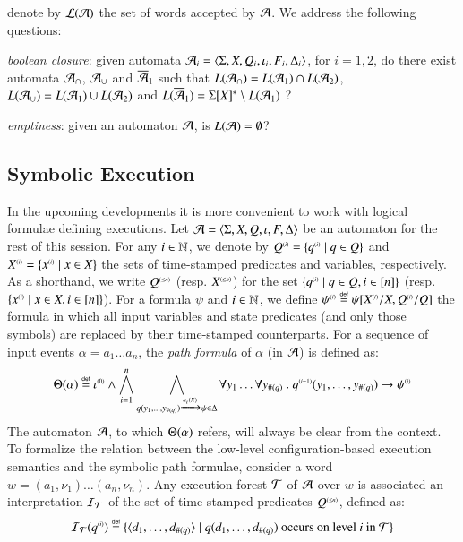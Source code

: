 \documentclass{llncs}
\begin{document}
denote by ${\mathcal L}({\mathcal{A}})$ the set of words accepted by $\mathcal{A}$. We address
the following questions: \begin{compactenum}
\item \emph{boolean closure}: given automata $\mathcal{A}_i =
  \langle \Sigma,X,Q_i,\iota_i,F_i,\Delta_i \rangle$, for $i=1,2$, do there
  exist automata $\mathcal{A}_\cap$, $\mathcal{A}_\cup$ and $\overline{\mathcal{A}}_1$ such that
  $L(\mathcal{A}_\cap) = L(\mathcal{A}_1) \cap L(\mathcal{A}_2)$, $L(\mathcal{A}_\cup) = L(\mathcal{A}_1) \cup
  L(\mathcal{A}_2)$ and $L(\overline{\mathcal{A}}_1) = \Sigma[X]^* \setminus L(\mathcal{A}_1)$ ?
%
\item \emph{emptiness}: given an automaton $\mathcal{A}$, is $L(\mathcal{A}) =
  \emptyset$?
\end{compactenum}

\subsection{Symbolic Execution}

In the upcoming developments it is more convenient to work with
logical formulae defining executions. Let $\mathcal{A} =
\langle \Sigma,X,Q,\iota,F,\Delta \rangle$ be an automaton for the rest of
this session. For any $i \in {\bf \mathbb{N}}$, we denote by ${Q}^{\scriptscriptstyle{({i})}} =
\{ {q}^{\scriptscriptstyle{({i})}} \mid q \in Q \}$ and ${X}^{\scriptscriptstyle{({i})}} = \{ {x}^{\scriptscriptstyle{({i})}}
  \mid x \in X \}$ the sets of time-stamped predicates and variables,
respectively. As a shorthand, we write ${Q}^{\scriptscriptstyle{({\leq n})}}$ (resp.
${X}^{\scriptscriptstyle{({\leq n})}}$) for the set $\{ {q}^{\scriptscriptstyle{({i})}} \mid q \in Q, i
  \in [n] \}$ (resp. $\{ {x}^{\scriptscriptstyle{({i})}} \mid x \in X, i \in [n] \}$). For
a formula $\psi$ and $i \in {\bf \mathbb{N}}$, we define ${\psi}^{\scriptscriptstyle{({i})}} \stackrel{\scriptscriptstyle{\mathsf{def}}}{=}
\psi[{X}^{\scriptscriptstyle{({i})}}/X,{Q}^{\scriptscriptstyle{({i})}}/Q]$ the formula in which all input
variables and state predicates (and only those symbols) are replaced
by their time-stamped counterparts. For a sequence of input events
$\alpha = a_1 \ldots a_n$, the \emph{path formula} of $\alpha$ (in
$\mathcal{A}$) is defined as:
\[\Theta({\alpha}) \stackrel{\scriptscriptstyle{\mathsf{def}}}{=} {\iota}^{\scriptscriptstyle{({0})}} \wedge 
\bigwedge_{i=1}^n \bigwedge_{q(y_1,\ldots,y_{\#(q)}) \xrightarrow{{\scriptscriptstyle a_i(X)}}_{{\scriptstyle }}
  \psi \in \Delta} \forall y_1 \ldots \forall y_{\#(q)} ~.~
{q}^{\scriptscriptstyle{({i-1})}}(y_1,\ldots,y_{\#(q)}) \rightarrow {\psi}^{\scriptscriptstyle{({i})}}\]
The automaton $\mathcal{A}$, to which $\Theta({\alpha})$ refers, will always
be clear from the context. To formalize the relation between the
low-level configuration-based execution semantics and the symbolic
path formulae, consider a word $w=(a_1,\nu_1) \ldots (a_n,\nu_n)$. Any
execution forest $\mathcal{T}$ of $\mathcal{A}$ over $w$ is associated an interpretation
$\mathcal{I}_{\mathcal{T}}$ of the set of time-stamped predicates ${Q}^{\scriptscriptstyle{({\leq n})}}$,
defined as:
\[\mathcal{I}_{\mathcal{T}}({q}^{\scriptscriptstyle{({i})}}) \stackrel{\scriptscriptstyle{\mathsf{def}}}{=} \{ \langle d_1,\ldots,d_{\#(q)} \rangle \mid
  q(d_1,\ldots,d_{\#(q)}) \text{ occurs on level $i$ in $\mathcal{T}$} \}\]
\end{document}
